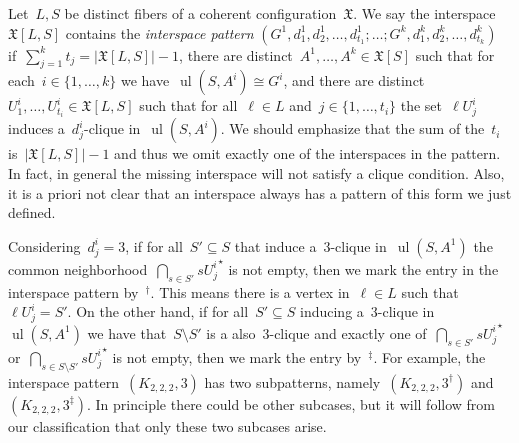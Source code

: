 \documentclass[english,a4paper]{article}
\theoremstyle{plain}
\theoremstyle{definition}
\newcommand{\abs}[1]{| #1 |}
\newcommand{\coherentConfig}{\ensuremath{\mathfrak{X}}}
\newcommand{\interspace}[2]{\ensuremath{\coherentConfig[#1,#2]}}
\newcommand{\inducedCC}[1]{\ensuremath{\coherentConfig[#1]}}
\DeclareMathOperator*{\ul}{ul}
\newcommand{\arcs}{\ensuremath{A}}
\newcommand{\ipsixMatchingComplement} {\ensuremath{(\clique{2,2,2},3^\dag)}}
\newcommand{\ipsixMatchingComplementD}{\ensuremath{(\clique{2,2,2},3^\ddag)}}
\newcommand{\clique}[1]{\ensuremath{K_{#1}}}
\begin{document}
Let~$L,S$ be distinct fibers of a coherent configuration~$\coherentConfig$.
We say the interspace~$\interspace{L}{S}$ contains the \emph{interspace pattern} $(G^1, d^1_1, d^1_2, \dots, d^1_{t_1}; \dots; G^k, d^k_1, d^k_2, \dots, d^k_{t_k})$ if~$\sum_{j = 1}^{k} t_j = \abs{\interspace{L}{S}} - 1$, there are distinct~$\arcs^1, \dots, \arcs^k \in \inducedCC{S}$ such that for each~$i \in \{1,\dots,k\}$ we have~$\ul(S,\arcs^i) \cong G^i$, and there are distinct~$U^i_1, \dots, U^i_{t_i} \in \interspace{L}{S}$ such that for all~$\ell \in L$ and~$j \in \{1, \dots, t_i\}$ the set~$\ell U^i_j$ induces a~$d^i_j$-clique in~$\ul(S,A^i)$. We should emphasize that the sum of the~$t_i$ is~$\abs{\interspace{L}{S}} - 1$ and thus we omit exactly one of the interspaces in the pattern. In fact, in general the missing interspace will not satisfy a clique condition. Also, it is a priori not clear that an interspace always has a pattern of this form we just defined.

Considering~$d^i_j = 3$, if for all~$S' \subseteq S$ that induce a~$3$-clique in~$\ul(S,A^1)$ the common neighborhood~$\bigcap_{s \in S'} s {U^i_j}^\star$ is not empty, then we mark the entry in the interspace pattern by~$^\dag$. This means there is a vertex in~$\ell\in L$ such that~$\ell U^i_j= S'$.
On the other hand, if  for all~$S' \subseteq S$ inducing a~$3$-clique in~$\ul(S,A^1)$ we have that~$S\setminus S'$ is a also~$3$-clique and exactly one of~$\bigcap_{s \in S'} s {U^i_j}^\star$ or~$\bigcap_{s \in S \setminus S'} s {U^i_j}^\star$ is not empty, then we mark the entry by~$^\ddag$.
For example, the interspace pattern~$(\clique{2,2,2},3)$ has two subpatterns, namely~\ipsixMatchingComplement\xspace and~\ipsixMatchingComplementD. In principle there could be other subcases, but it will follow from our classification that only these two subcases arise.
\end{document}
